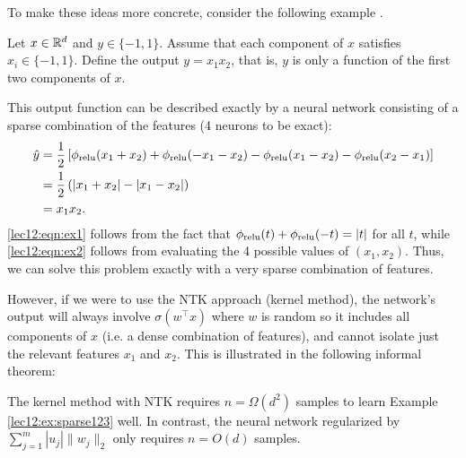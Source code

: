 To make these ideas more concrete, consider the following example \cite{wei2020regularization}. 
\begin{example}\label{lec12:ex:sparse123}
Let $x \in \mathbb R^d$ and $y \in \{-1, 1\}$. Assume that each component of $x$ satisfies $x_i \in \{ -1, 1\}$. Define the output $y = x_1x_2$, that is, $y$ is only a function of the first two components of $x$.

This output function can be described exactly by a neural network consisting of a sparse combination of the features (4 neurons to be exact):
\begin{align}
\hat y &= \frac{1}{2} \left[ \phi_{\textup{relu}}(x_1 + x_2) + \phi_{\textup{relu}}(-x_1 - x_2)  - \phi_{\textup{relu}}(x_1 - x_2) -  \phi_{\textup{relu}}(x_2 - x_1)  \right] \\
&= \frac{1}{2}\left( |x_1 + x_2| - |x_1 - x_2| \right) \label{lec12:eqn:ex1} \\
&= x_1x_2. \label{lec12:eqn:ex2}
\end{align}
\eqref{lec12:eqn:ex1} follows from the fact that $\phi_{\textup{relu}}(t) + \phi_{\textup{relu}}(-t) = |t|$ for all $t$, while \eqref{lec12:eqn:ex2} follows from evaluating the 4 possible values of $(x_1, x_2)$. Thus, we can solve this problem exactly with a very sparse combination of features.

However, if we were to use the NTK approach (kernel method), the network's output will always involve $\sigma(w^\top x)$ where $w$ is random so it includes all components of $x$ (i.e. a dense combination of features), and cannot isolate just the relevant features $x_1$ and $x_2$. This is illustrated in the following informal theorem:
\begin{theorem}
The kernel method with NTK requires $n = \Omega(d^2)$ samples to learn Example \ref{lec12:ex:sparse123} well. In contrast, the neural network regularized by $\sum_{j = 1}^m | u_j| \| w_j\|_2$ only requires $n = O(d)$ samples.
\end{theorem}
\end{example}


